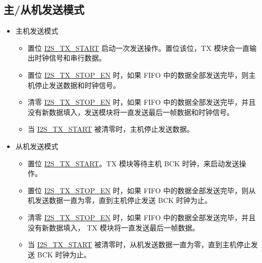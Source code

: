 \documentclass[main\_\_CN.tex]{subfiles}
\begin{document}
\subsection{主/从机发送模式} \label{sec:i2s-master-slave-tx-mode}
\begin{itemize}
    \item 主机发送模式
    \begin{itemize}
        \item 置位 \hyperref[fielddesc:I2STXSTART]{I2S\_TX\_START} 启动一次发送操作。置位该位，TX 模块会一直输出时钟信号和串行数据。
        \item 置位 \hyperref[fielddesc:I2STXSTOPEN]{I2S\_TX\_STOP\_EN} 时，如果 FIFO 中的数据全部发送完毕，则主机停止发送数据和时钟信号。
        \item 清零 \hyperref[fielddesc:I2STXSTOPEN]{I2S\_TX\_STOP\_EN} 时，如果 FIFO 中的数据全部发送完毕，并且没有新数据填入，发送模块将一直发送最后一帧数据和时钟信号。
        \item 当 \hyperref[fielddesc:I2STXSTART]{I2S\_TX\_START} 被清零时，主机停止发送数据。
    \end{itemize}
    \item 从机发送模式
     \begin{itemize}
        \item 置位 \hyperref[fielddesc:I2STXSTART]{I2S\_TX\_START}。TX 模块等待主机 BCK 时钟，来启动发送操作。
        \item 置位 \hyperref[fielddesc:I2STXSTOPEN]{I2S\_TX\_STOP\_EN} 时，如果 FIFO 中的数据全部发送完毕，则从机发送数据一直为零，直到主机停止发送 BCK 时钟为止。
        \item 清零 \hyperref[fielddesc:I2STXSTOPEN]{I2S\_TX\_STOP\_EN} 时，如果 FIFO 中的数据全部发送完毕，并且没有新数据填入， TX 模块将一直发送最后一帧数据。
        \item 当 \hyperref[fielddesc:I2STXSTART]{I2S\_TX\_START} 被清零时，从机发送数据一直为零，直到主机停止发送 BCK 时钟为止。
    \end{itemize}
\end{itemize}
\end{document}
